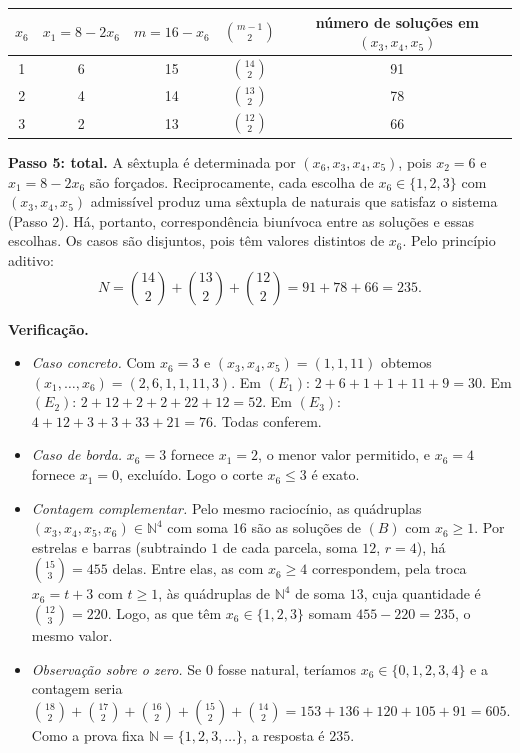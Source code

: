 \documentclass{article}%
\begin{document}
\begin{center}
\begin{tabular}{c|c|c|c|c}
$x_6$ & $x_1=8-2x_6$ & $m=16-x_6$ & $\binom{m-1}{2}$ & número de soluções em $(x_3,x_4,x_5)$ \\ \hline
1 & 6 & 15 & $\binom{14}{2}$ & 91 \\
2 & 4 & 14 & $\binom{13}{2}$ & 78 \\
3 & 2 & 13 & $\binom{12}{2}$ & 66 \\
\end{tabular}
\end{center}

\textbf{Passo 5: total.} A sêxtupla é determinada por $(x_6,x_3,x_4,x_5)$, pois $x_2=6$ e $x_1=8-2x_6$ são forçados. Reciprocamente, cada escolha de $x_6\in\{1,2,3\}$ com $(x_3,x_4,x_5)$ admissível produz uma sêxtupla de naturais que satisfaz o sistema (Passo 2). Há, portanto, correspondência biunívoca entre as soluções e essas escolhas. Os casos são disjuntos, pois têm valores distintos de $x_6$. Pelo princípio aditivo:
\begin{equation*}
N=\binom{14}{2}+\binom{13}{2}+\binom{12}{2}=91+78+66=235.
\end{equation*}

\textbf{Verificação.}
\begin{itemize}
\item \emph{Caso concreto.} Com $x_6=3$ e $(x_3,x_4,x_5)=(1,1,11)$ obtemos $(x_1,\ldots,x_6)=(2,6,1,1,11,3)$. Em $(E_1)$: $2+6+1+1+11+9=30$. Em $(E_2)$: $2+12+2+2+22+12=52$. Em $(E_3)$: $4+12+3+3+33+21=76$. Todas conferem.
\item \emph{Caso de borda.} $x_6=3$ fornece $x_1=2$, o menor valor permitido, e $x_6=4$ fornece $x_1=0$, excluído. Logo o corte $x_6\leq 3$ é exato.
\item \emph{Contagem complementar.} Pelo mesmo raciocínio, as quádruplas $(x_3,x_4,x_5,x_6)\in\mathbb{N}^4$ com soma $16$ são as soluções de $(B)$ com $x_6\geq 1$. Por estrelas e barras (subtraindo $1$ de cada parcela, soma $12$, $r=4$), há $\binom{15}{3}=455$ delas. Entre elas, as com $x_6\geq 4$ correspondem, pela troca $x_6=t+3$ com $t\geq 1$, às quádruplas de $\mathbb{N}^4$ de soma $13$, cuja quantidade é $\binom{12}{3}=220$. Logo, as que têm $x_6\in\{1,2,3\}$ somam $455-220=235$, o mesmo valor.
\item \emph{Observação sobre o zero.} Se $0$ fosse natural, teríamos $x_6\in\{0,1,2,3,4\}$ e a contagem seria $\binom{18}{2}+\binom{17}{2}+\binom{16}{2}+\binom{15}{2}+\binom{14}{2}=153+136+120+105+91=605$. Como a prova fixa $\mathbb{N}=\{1,2,3,\ldots\}$, a resposta é $235$.
\end{itemize}
\end{document}
